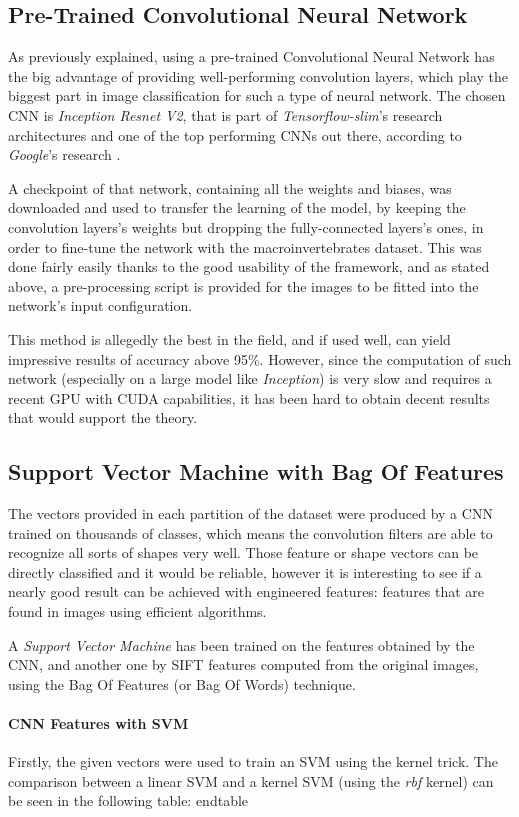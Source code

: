 \documentclass[conference]{IEEEtran}
\begin{document}
\subsection{Pre-Trained Convolutional Neural Network}
    As previously explained, using a pre-trained Convolutional Neural Network has the big advantage of providing well-performing convolution layers, which play the biggest part in image classification for such a type of neural network.
    The chosen CNN is \emph{Inception Resnet V2}, that is part of \emph{Tensorflow-slim}'s research architectures and one of the top performing CNNs out there, according to \emph{Google}'s research \cite{b3}.

A checkpoint of that network, containing all the weights and biases, was downloaded and used to transfer the learning of the model, by keeping the convolution layers's weights but dropping the fully-connected layers's ones, in order to fine-tune the network with the macroinvertebrates dataset.
This was done fairly easily thanks to the good usability of the framework, and as stated above, a pre-processing script is provided for the images to be fitted into the network's input configuration.

This method is allegedly the best in the field, and if used well, can yield impressive results of accuracy above 95\%. However, since the computation of such network (especially on a large model like \emph{Inception}) is very slow and requires a recent GPU with CUDA capabilities, it has been hard to obtain decent results that would support the theory.

\subsection{Support Vector Machine with Bag Of Features}
    The vectors provided in each partition of the dataset were produced by a CNN trained on thousands of classes, which means the convolution filters are able to recognize all sorts of shapes very well.
Those feature or shape vectors can be directly classified and it would be reliable, however it is interesting to see if a nearly good result can be achieved with engineered features: features that are found in images using efficient algorithms.

    A \emph{Support Vector Machine} has been trained on the features obtained by the CNN, and another one by SIFT features computed from the original images, using the Bag Of Features (or Bag Of Words) technique.

\paragraph{CNN Features with SVM}
    Firstly, the given vectors were used to train an SVM using the kernel trick. The comparison between a linear SVM and a kernel SVM (using the \emph{rbf} kernel) can be seen in the following table:
end{table}
\end{document}
